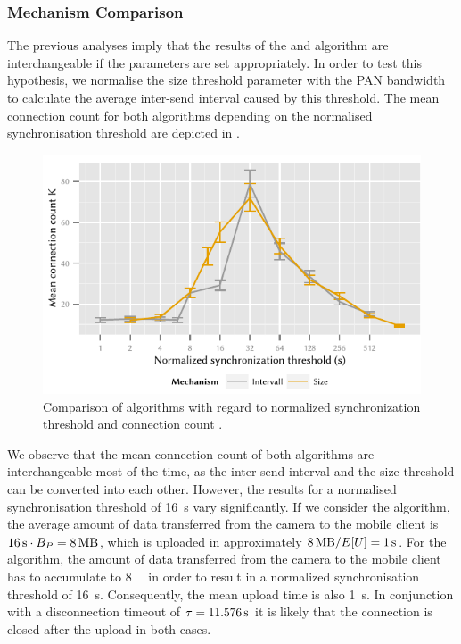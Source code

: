 \subsubsection*{Mechanism Comparison}\label{sec:application:cloud_file_synchronisation:numerical_evaluation:mechanism_comparison}
The previous analyses imply that the results of the \algointerval and \algosize algorithm are interchangeable if the parameters are set appropriately.
In order to test this hypothesis, we normalise the size threshold parameter with the \gls{PAN} bandwidth to calculate the average inter-send interval caused by this threshold.
The mean connection count \connectionCount for both algorithms depending on the normalised synchronisation threshold are depicted in . 
\begin{figure}
  \includegraphics{application/cloud_file_synchronization/numerical_evaluation/figures/comparison}
  \caption{Comparison of algorithms with regard to normalized synchronization threshold and connection count \connectionCount.}
  \label{fig:application:cloud_file_synchronisation:numerical_evaluation:mechanism_comparison:comparison}
\end{figure}

We observe that the mean connection count \connectionCount of both algorithms are interchangeable most of the time, as the inter-send interval and the size threshold can be converted into each other.
However, the results for a normalised synchronisation threshold of \SI{16}{\second} vary significantly.
If we consider the \algointerval algorithm, the average amount of data transferred from the camera to the mobile client is \(\SI{16}{\second} \cdot \panTransferRate=\SI{8}{\mega\byte}\), which is uploaded in approximately \(\SI{8}{\mega\byte} / E[U] = \SI{1}{\second}\).
For the \algosize algorithm, the amount of data transferred from the camera to the mobile client has to accumulate to \SI{8}{\mega\byte} in order to result in a normalized synchronisation threshold of \SI{16}{\second}.
Consequently, the mean upload time is also \SI{1}{\second}.
In conjunction with a disconnection timeout of \(\tau = \SI{11.576}{\second}\) it is likely that the connection is closed after the upload in both cases.

